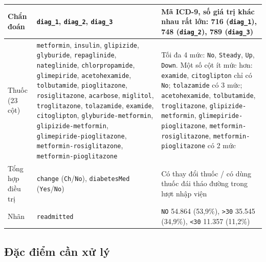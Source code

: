 \documentclass[a4paper]{report}
\begin{document}
{\begin{longtable}{|>{\raggedright\arraybackslash}p{118.46pt}|>{\raggedright\arraybackslash}p{158.09pt}|>{\raggedright\arraybackslash}p{158.09pt}|}
Chẩn đoán & \texttt{diag\_\allowbreak{}1}, \texttt{diag\_\allowbreak{}2}, \texttt{diag\_\allowbreak{}3} & Mã ICD-9, số giá trị khác nhau rất lớn: 716 (\texttt{diag\_\allowbreak{}1}), 748 (\texttt{diag\_\allowbreak{}2}), 789 (\texttt{diag\_\allowbreak{}3}) \\ \hline
Thuốc (23 cột) & \texttt{metformin}, \texttt{insulin}, \texttt{glipizide}, \texttt{glyburide}, \texttt{repaglinide}, \texttt{nateglinide}, \texttt{chlorpropamide}, \texttt{glimepiride}, \texttt{acetohexamide}, \texttt{tolbutamide}, \texttt{pioglitazone}, \texttt{rosiglitazone}, \texttt{acarbose}, \texttt{miglitol}, \texttt{troglitazone}, \texttt{tolazamide}, \texttt{examide}, \texttt{citoglipton}, \texttt{glyburide-\allowbreak{}metformin}, \texttt{glipizide-\allowbreak{}metformin}, \texttt{glimepiride-\allowbreak{}pioglitazone}, \texttt{metformin-\allowbreak{}rosiglitazone}, \texttt{metformin-\allowbreak{}pioglitazone} & Tối đa 4 mức: \texttt{No}, \texttt{Steady}, \texttt{Up}, \texttt{Down}. Một số cột ít mức hơn: \texttt{examide}, \texttt{citoglipton} chỉ có \texttt{No}; \texttt{tolazamide} có 3 mức; \texttt{acetohexamide}, \texttt{tolbutamide}, \texttt{troglitazone}, \texttt{glipizide-\allowbreak{}metformin}, \texttt{glimepiride-\allowbreak{}pioglitazone}, \texttt{metformin-\allowbreak{}rosiglitazone}, \texttt{metformin-\allowbreak{}pioglitazone} có 2 mức \\ \hline
Tổng hợp điều trị & \texttt{change} (\texttt{Ch}/\texttt{No}), \texttt{diabetesMed} (\texttt{Yes}/\texttt{No}) & Có thay đổi thuốc / có dùng thuốc đái tháo đường trong lượt nhập viện \\ \hline
Nhãn & \texttt{readmitted} & \texttt{NO} 54.864 (53,9\%), \texttt{>30} 35.545 (34,9\%), \texttt{<30} 11.357 (11,2\%) \\ \hline
\end{longtable}
}

\subsection{Đặc điểm cần xử lý}
\end{document}
